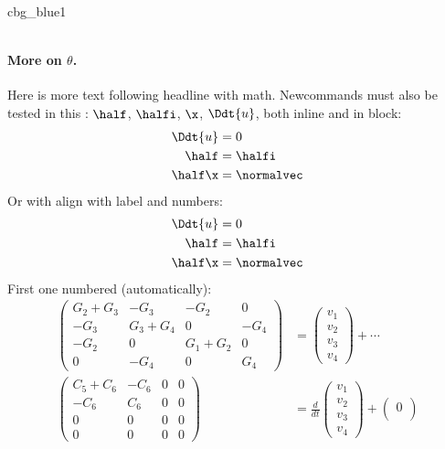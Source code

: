 \documentclass[%
oneside,                 %
final,                   %
10pt]{article}
\newenvironment{_cod_tight}[1]{
   \def\FrameCommand{\colorbox{#1}}
   \FrameRule0.6pt\MakeFramed {\FrameRestore}\vskip3mm}
   {\vskip0mm\endMakeFramed}
\newenvironment{cod}[1]{
\bgroup\rmfamily
\fboxsep=0mm\relax
\begin{_cod_tight}{#1}
\list{}{\parsep=-2mm\parskip=0mm\topsep=0pt\leftmargin=2mm
\rightmargin=2\leftmargin\leftmargin=4pt\relax}
\item\relax}
{\endlist\end{_cod_tight}\egroup}
\theoremstyle{definition}
\begin{document}
\begin{enumerate}
\begin{cod}{cbg_blue1}
\begin{lstlisting}[language=Python,style=myspeciallststyle,numbers=left,numberstyle=\tiny,stepnumber=3,numbersep=15pt,xleftmargin=1mm]
\end{lstlisting}\end{cod}
\noindent

\paragraph{More on $\theta$.}
Here is more text following headline with math.
Newcommands must also be tested in this \report:
$\half$, $\halfi$, $\x$, $\Ddt{u}$,
both inline and in block:
\begin{align}
\Ddt{u} &= 0\nonumber
\\ 
\half &= \halfi\\ 
\half\x &= \normalvec
\end{align}
Or with align with label and numbers:
\begin{align}
\Ddt{u} &= 0
\label{aligneq1}
\\ 
\half &= \halfi\\ 
\half\x &= \normalvec
\label{aligneq2}
\end{align}
First one numbered (automatically):
\begin{align}
\begin{pmatrix}
G_2 + G_3 & -G_3 & -G_2 & 0 \\ 
-G_3 & G_3 + G_4 & 0 & -G_4 \\ 
-G_2 & 0 & G_1 + G_2 & 0 \\ 
0 & -G_4 & 0 & G_4
\end{pmatrix}
&=
\begin{pmatrix}
 v_1 \\ 
 v_2 \\ 
 v_3 \\ 
 v_4
\end{pmatrix}
+ \cdots \\ 
\begin{pmatrix}
 C_5 + C_6 & -C_6 & 0 & 0 \\ 
 -C_6 & C_6 & 0 & 0 \\ 
 0 & 0 & 0 & 0 \\ 
 0 & 0 & 0 & 0
\end{pmatrix}
  &= \frac{d}{dt}\begin{pmatrix}
 v_1 \\ 
 v_2 \\ 
 v_3 \\ 
 v_4
\end{pmatrix} +
\begin{pmatrix}
 0 \\ 

\end{pmatrix}
\end{align}
\end{enumerate}
\end{document}
